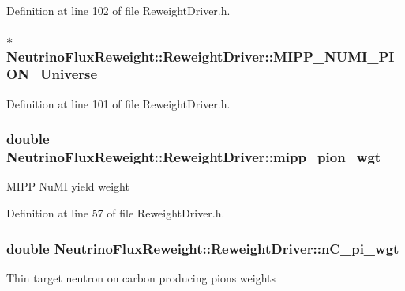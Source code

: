 Definition at line 102 of file Reweight\-Driver.\-h.

\hypertarget{class_neutrino_flux_reweight_1_1_reweight_driver_adc0be38614dfed8be560f60dda603d71}{
\subsubsection[{M\-I\-P\-P\-\_\-\-N\-U\-M\-I\-\_\-\-P\-I\-O\-N\-\_\-\-Universe}]{$\ast$ Neutrino\-Flux\-Reweight\-::\-Reweight\-Driver\-::\-M\-I\-P\-P\-\_\-\-N\-U\-M\-I\-\_\-\-P\-I\-O\-N\-\_\-\-Universe}}\label{class_neutrino_flux_reweight_1_1_reweight_driver_adc0be38614dfed8be560f60dda603d71}


Definition at line 101 of file Reweight\-Driver.\-h.

\hypertarget{class_neutrino_flux_reweight_1_1_reweight_driver_a8e9c45612df3e46980dd60e9247311c4}{
\subsubsection[{mipp\-\_\-pion\-\_\-wgt}]{\setlength{\rightskip}{0pt plus 5cm}double Neutrino\-Flux\-Reweight\-::\-Reweight\-Driver\-::mipp\-\_\-pion\-\_\-wgt}}\label{class_neutrino_flux_reweight_1_1_reweight_driver_a8e9c45612df3e46980dd60e9247311c4}
M\-I\-P\-P Nu\-M\-I yield weight 

Definition at line 57 of file Reweight\-Driver.\-h.

\hypertarget{class_neutrino_flux_reweight_1_1_reweight_driver_aaf002e71ebfbd7651b0e2c6d2aa11f43}{
\subsubsection[{n\-C\-\_\-pi\-\_\-wgt}]{\setlength{\rightskip}{0pt plus 5cm}double Neutrino\-Flux\-Reweight\-::\-Reweight\-Driver\-::n\-C\-\_\-pi\-\_\-wgt}}\label{class_neutrino_flux_reweight_1_1_reweight_driver_aaf002e71ebfbd7651b0e2c6d2aa11f43}
Thin target neutron on carbon producing pions weights 

